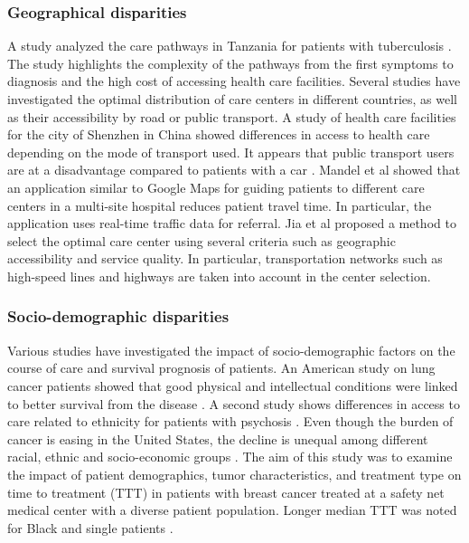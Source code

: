 \subsubsection{Geographical disparities}


A study analyzed the care pathways in Tanzania for patients with tuberculosis
\cite{mhalu_pathways_2019}. The study highlights the complexity of the pathways
from the first symptoms to diagnosis and the high cost of accessing health care
facilities. Several studies have investigated the optimal distribution of care
centers in different countries, as well as their accessibility by road or public
transport. A study of health care facilities for the city of Shenzhen in China
showed differences in access to health care depending on the mode of transport
used. It appears that public transport users are at a disadvantage compared to
patients with a car \cite{tao_spatial_2018}. Mandel et al
\cite{mandel_optimizing_2018} showed that an application similar to Google Maps
for guiding patients to different care centers in a multi-site hospital reduces
patient travel time. In particular, the application uses real-time traffic data
for referral. Jia et al \cite{jia_selecting_2014} proposed a method to select
the optimal care center using several criteria such as geographic accessibility
and service quality. In particular, transportation networks such as high-speed
lines and highways are taken into account in the center selection.

\subsubsection{Socio-demographic disparities}


Various studies have investigated the impact of socio-demographic factors on the
course of care and survival prognosis of patients. An American study on lung
cancer patients showed that good physical and intellectual conditions were
linked to better survival from the disease
\cite{pierzynski_socio-demographic_2018}. A second study shows differences in
access to care related to ethnicity for patients with psychosis
\cite{anderson_meta-analysis_2014}. Even though the burden of cancer is easing
in the United States, the decline is unequal among different racial, ethnic and
socio-economic groups \cite{viswanath_science_2005}. The aim of this study was
to examine the impact of patient demographics, tumor characteristics, and
treatment type on time to treatment (TTT) in patients with breast cancer treated
at a safety net medical center with a diverse patient population. Longer median
TTT was noted for Black and single patients \cite{khanna_impact_2017}.

